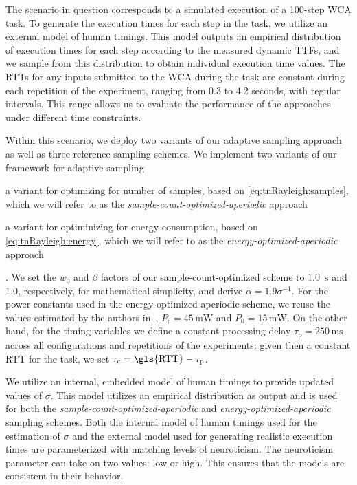 The scenario in question corresponds to a simulated execution of a \num{100}-step \gls{WCA} task.
To generate the execution times for each step in the task, we utilize an external model of human timings.
This model outputs an empirical distribution of execution times for each step according to the measured dynamic \glspl{TTF}, and we sample from this distribution to obtain individual execution time values.
The \glspl{RTT} for any inputs submitted to the \gls{WCA} during the task are constant during each repetition of the experiment, ranging from 0.3 to 4.2 seconds, with regular intervals. 
This range allows us to evaluate the performance of the approaches under different time constraints.

Within this scenario, we deploy two variants of our adaptive sampling approach as well as three reference sampling schemes.
We implement two variants of our framework for adaptive sampling
\begin{enumerate*}[itemjoin={{; }}, itemjoin*={{; and }}]
    \item a variant for optimizing for number of samples, based on \cref{eq:tnRayleigh:samples}, which we will refer to as the \emph{sample-count-optimized-aperiodic} approach
    \item a variant for optiminizing for energy consumption, based on \cref{eq:tnRayleigh:energy}, which we will refer to as the \emph{energy-optimized-aperiodic} approach
\end{enumerate*}.
We set the \( w_0 \) and \( \beta \) factors of our sample-count-optimized scheme to \SI{1.0}{\second} and \num{1.0}, respectively, for mathematical simplicity, and derive \( \alpha = 1.9 \sigma^{-1} \).
For the power constants used in the energy-optimized-aperiodic scheme, we reuse the values estimated by the authors in~\cite{moothedath2022energy1}, \( P_\text{c} = 45\,\si{\milli\watt} \) and \( P_\text{0} = 15\,\si{\milli\watt} \).
On the other hand, for the timing variables we define a constant processing delay \( \tau_\text{p} = 250\,\si{\milli\second} \) across all configurations and repetitions of the experiments; given then a constant \gls{RTT} for the task, we set \( \tau_\text{c} = \text{\gls{RTT}} - \tau_\text{p} \).

We utilize an internal, embedded model of human timings to provide updated values of \ensuremath{\sigma}.
This model utilizes an empirical distribution as output and is used for both the \emph{sample-count-optimized-aperiodic} and \emph{energy-optimized-aperiodic} sampling schemes.
Both the internal model of human timings used for the estimation of \ensuremath{\sigma} and the external model used for generating realistic execution times are parameterized with matching levels of neuroticism.
The neuroticism parameter can take on two values: low or high.
This ensures that the models are consistent in their behavior.

